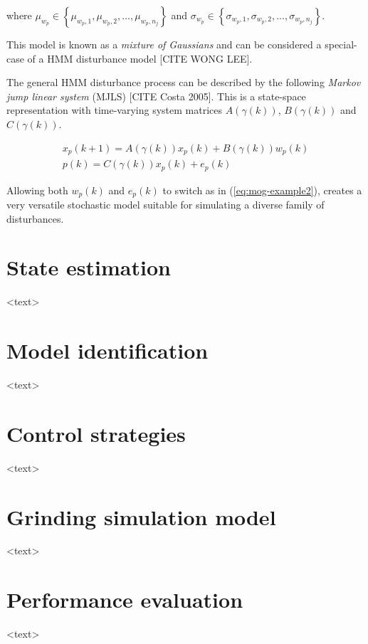 where $\mu_{w_p}\in\left\{\mu_{w_p,1},\mu_{w_p,2},...,\mu_{w_p,n_j}\right\}$ and $\sigma_{w_p}\in\left\{\sigma_{w_p,1},\sigma_{w_p,2},...,\sigma_{w_p,n_j}\right\}$.

This model is known as a \textit{mixture of Gaussians} and can be considered a special-case of a HMM disturbance model [CITE WONG LEE].

The general HMM disturbance process can be described by the following \textit{Markov jump linear system} (MJLS) [CITE Costa 2005]. This is a state-space representation with time-varying system matrices $A(\gamma(k))$, $B(\gamma(k))$ and $C(\gamma(k))$.

\begin{equation} \label{eq:HMM}
	\begin{split}
	x_p(k+1)= A(\gamma(k))x_p(k)+B(\gamma(k))w_p(k) \\
	p(k)=C(\gamma(k))x_p(k) + e_p(k)
	\end{split}
\end{equation}

Allowing both $w_p(k)$ and $e_p(k)$ to switch as in (\ref{eq:mog-example2}), creates a very versatile stochastic model suitable for simulating a diverse family of disturbances.


\section{State estimation}

<text>


\section{Model identification}


<text>


\section{Control strategies}

<text>


\section{Grinding simulation model}

<text>


\section{Performance evaluation}
	
<text>

